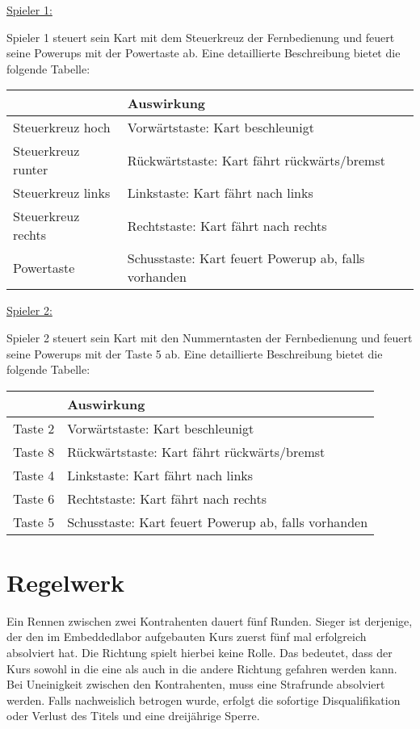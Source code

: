 \underline{Spieler 1:}

Spieler 1 steuert sein Kart mit dem Steuerkreuz der Fernbedienung und feuert seine Powerups mit der Powertaste ab. Eine detaillierte Beschreibung bietet die folgende Tabelle:

\vspace{0.5cm}
\begin{tabular}{|l|l|}
\hline
\textbf{Taste & Auswirkung} \\ \hline
Steuerkreuz hoch & Vorwärtstaste: Kart beschleunigt \\ \hline
Steuerkreuz runter & Rückwärtstaste: Kart fährt rückwärts/bremst \\ \hline
Steuerkreuz links & Linkstaste: Kart fährt nach links \\ \hline
Steuerkreuz rechts & Rechtstaste: Kart fährt nach rechts \\ \hline
Powertaste & Schusstaste: Kart feuert Powerup ab, falls vorhanden \\ \hline  
\end{tabular} 
\vspace{0.5cm}

\underline{Spieler 2:}
 
Spieler 2 steuert sein Kart mit den Nummerntasten der Fernbedienung und feuert seine Powerups mit der Taste 5 ab. Eine detaillierte Beschreibung bietet die folgende Tabelle:

\vspace{0.5cm}
\begin{tabular}{|l|l|}
\hline
\textbf{Taste & Auswirkung} \\ \hline
Taste 2 & Vorwärtstaste: Kart beschleunigt \\ \hline
Taste 8 & Rückwärtstaste: Kart fährt rückwärts/bremst \\ \hline
Taste 4 & Linkstaste: Kart fährt nach links \\ \hline
Taste 6 & Rechtstaste: Kart fährt nach rechts \\ \hline
Taste 5 & Schusstaste: Kart feuert Powerup ab, falls vorhanden \\ \hline 
\end{tabular}
\vspace{0.5cm}

\section{Regelwerk}
Ein Rennen zwischen zwei Kontrahenten dauert fünf Runden. Sieger ist derjenige, der den im Embeddedlabor aufgebauten Kurs zuerst fünf mal erfolgreich absolviert hat. Die Richtung spielt hierbei keine Rolle. Das bedeutet, dass der Kurs sowohl in die eine als auch in die andere Richtung gefahren werden kann. Bei Uneinigkeit zwischen den Kontrahenten, muss eine Strafrunde absolviert werden. Falls nachweislich betrogen wurde, erfolgt die sofortige Disqualifikation oder Verlust des Titels und eine dreijährige Sperre. 

